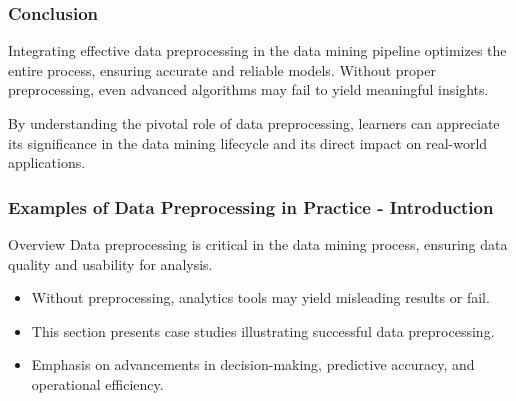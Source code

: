 \documentclass[aspectratio=169]{beamer}
\begin{document}
\begin{frame}[fragile]
    \frametitle{Conclusion}
    Integrating effective data preprocessing in the data mining pipeline optimizes the entire process, ensuring accurate and reliable models. 
    Without proper preprocessing, even advanced algorithms may fail to yield meaningful insights.
    
    By understanding the pivotal role of data preprocessing, learners can appreciate its significance in the data mining lifecycle and its direct impact on real-world applications.
\end{frame}

\begin{frame}[fragile]
    \frametitle{Examples of Data Preprocessing in Practice - Introduction}
    \begin{block}{Overview}
        Data preprocessing is critical in the data mining process, ensuring data quality and usability for analysis.  
    \end{block}
    \begin{itemize}
        \item Without preprocessing, analytics tools may yield misleading results or fail. 
        \item This section presents case studies illustrating successful data preprocessing.
        \item Emphasis on advancements in decision-making, predictive accuracy, and operational efficiency.
    \end{itemize}
\end{frame}
\end{document}
